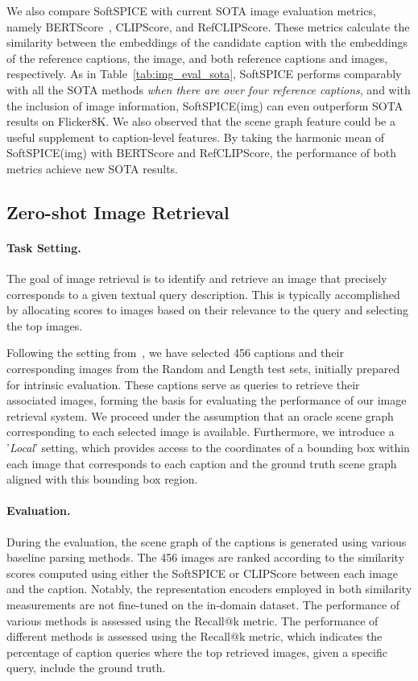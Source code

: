 We also compare SoftSPICE with current SOTA image evaluation metrics, namely BERTScore~\cite{zhang2019bertscore}, CLIPScore, and RefCLIPScore. These metrics calculate the similarity between the embeddings of the candidate caption with the embeddings of the reference captions, the image, and both reference captions and images, respectively. As in Table~\ref{tab:img_eval_sota}, SoftSPICE performs comparably with all the SOTA methods \textit{when there are over four reference captions}, and with the inclusion of image information, SoftSPICE(img) can even outperform SOTA results on Flicker8K. We also observed that the scene graph feature could be a useful supplement to caption-level features. By taking the harmonic mean of SoftSPICE(img) with BERTScore and RefCLIPScore, the performance of both metrics achieve new SOTA results.
\subsection{Zero-shot Image Retrieval}
\paragraph{Task Setting.} The goal of image retrieval is to identify and retrieve an image that precisely corresponds to a given textual query description. This is typically accomplished by allocating scores to images based on their relevance to the query and selecting the top  images. 

Following the setting from~\citet{johnson2015image,wang2018scene}, we have selected 456 captions and their corresponding images from the Random and Length test sets, initially prepared for intrinsic evaluation. These captions serve as queries to retrieve their associated images, forming the basis for evaluating the performance of our image retrieval system. We proceed under the assumption that an oracle scene graph corresponding to each selected image is available. Furthermore, we introduce a '\textit{Local}' setting, which provides access to the coordinates of a bounding box within each image that corresponds to each caption and the ground truth scene graph aligned with this bounding box region. 

\paragraph{Evaluation.} During the evaluation, the scene graph of the captions is generated using various baseline parsing methods. The 456 images are ranked according to the similarity scores computed using either the SoftSPICE or CLIPScore between each image and the caption. Notably, the representation encoders employed in both similarity measurements are not fine-tuned on the in-domain dataset. The performance of various methods is assessed using the Recall@k metric. The performance of different methods is assessed using the Recall@k metric, which indicates the percentage of caption queries where the top  retrieved images, given a specific query, include the ground truth.

